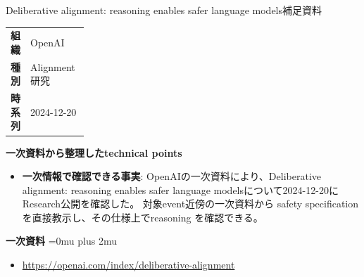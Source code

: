 \begin{technicalnote}{Deliberative alignment: reasoning enables safer language models}{補足資料}
\begingroup
\begin{tabularx}{\linewidth}{@{}>{\bfseries}p{0.22\linewidth}X@{}}
組織 & OpenAI \\
種別 & Alignment研究 \\
時系列 & 2024-12-20 \\
\end{tabularx}
\smallskip
{\bfseries 一次資料から整理したtechnical points}
\begin{itemize}[leftmargin=1.5em,itemsep=0.35em]
\item \textbf{一次情報で確認できる事実}: OpenAIの一次資料により、Deliberative alignment: reasoning enables safer language modelsについて2024-12-20にResearch公開を確認した。 対象event近傍の一次資料から safety specificationを直接教示し、その仕様上でreasoning を確認できる。
\end{itemize}
\begin{minipage}{\linewidth}
\begin{samepage}
{\bfseries 一次資料}
\begingroup\sloppy
\Urlmuskip=0mu plus 2mu\relax
\begin{itemize}[leftmargin=1.5em,itemsep=0.25em]
\item {\scriptsize\url{https://openai.com/index/deliberative-alignment}}
\end{itemize}
\endgroup
\end{samepage}
\end{minipage}
\endgroup
\end{technicalnote}
\medskip
